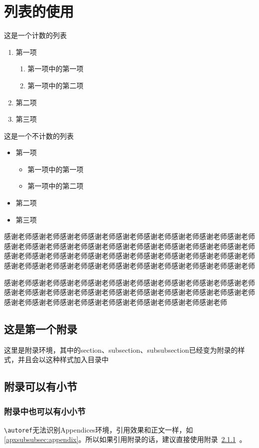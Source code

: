 \documentclass[supercite]{HustGraduPaper}
\begin{document}
	\section{列表的使用}
	这是一个计数的列表
	\begin{enumerate}
		\item 第一项
			\begin{enumerate}
				\item 第一项中的第一项
				\item 第一项中的第二项
			\end{enumerate}
		\item 第二项
		\item 第三项
	\end{enumerate}

	这是一个不计数的列表
	\begin{itemize}
		\item 第一项
		\begin{itemize}
			\item 第一项中的第一项
			\item 第一项中的第二项
		\end{itemize}
		\item 第二项
		\item 第三项
	\end{itemize}
	
	\begin{thankpage}
		感谢老师感谢老师感谢老师感谢老师感谢老师感谢老师感谢老师感谢老师感谢老师感谢老师感谢老师感谢老师感谢老师感谢老师感谢老师感谢老师感谢老师感谢老师感谢老师感谢老师感谢老师感谢老师感谢老师感谢老师感谢老师感谢老师感谢老师感谢老师感谢老师感谢老师感谢老师感谢老师感谢老师感谢老师感谢老师感谢老师
		
		感谢老师感谢老师感谢老师感谢老师感谢老师感谢老师感谢老师感谢老师感谢老师感谢老师感谢老师感谢老师感谢老师感谢老师感谢老师感谢老师感谢老师感谢老师感谢老师感谢老师感谢老师感谢老师感谢老师感谢老师感谢老师感谢老师
	\end{thankpage}
	
	
	
	\begin{appendices}
		\section{这是第一个附录}
		这里是附录环境，其中的section、subsection、subsubsection已经变为附录的样式，并且会以这种样式加入目录中
		\subsection{附录可以有小节}
		\subsubsection{附录中也可以有小小节}\label{apxsubsubsec:appendix}
		\verb|\autoref|无法识别Appendices环境，引用效果和正文一样，如\autoref{apxsubsubsec:appendix}。所以如果引用附录的话，建议直接使用附录~\ref{apxsubsubsec:appendix}~。
	\end{appendices}
	
\end{document}
